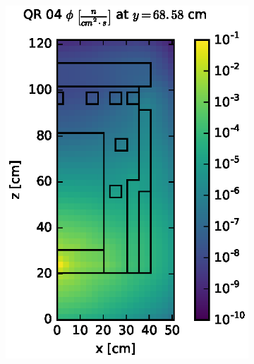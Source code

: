 \begin{figure}[!htb]
\centering
\begin{subfigure}{0.4\textwidth}
\includegraphics[max height=0.445\textheight]
{img/dlvn-plots/fwd/flux-qr04-slice.eps}
\end{subfigure} ~
\begin{subfigure}{0.4\textwidth}

\end{subfigure}
\end{figure}

